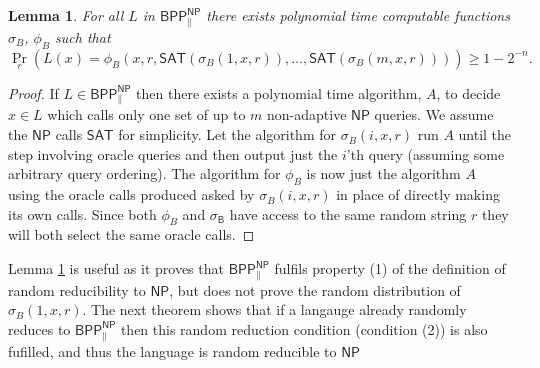 \documentclass[10pt,a4paper]{article}
\newtheorem{lemma}[theorem]{Lemma}
\begin{document}
\begin{lemma}\label{lma:BPP rr similarity}
    For all $L$ in $\mathsf{BPP^{NP}_{\parallel}}$ there exists polynomial time computable functions $\sigma_{B}$, $\phi_{B}$ such that
    \[
    \Pr_{r}\left(
            L(x)=\phi_{B}(x,r,\mathsf{SAT}(\sigma_{B}(1,x,r)),\ldots, \mathsf{SAT}(\sigma_{B}(m, x, r)))
            \right)\geq 1-2^{-n}.
    \]
\end{lemma}
\begin{proof}
    If $L\in \mathsf{BPP^{NP}_{\parallel}}$ then there exists a polynomial time algorithm, $A$, to decide $x \in L$ which calls only one set of up to $m$ non-adaptive $\mathsf{NP}$ queries. We assume the $\mathsf{NP}$ calls $\mathsf{SAT}$ for simplicity. Let the algorithm for $\sigma_{B}(i,x,r)$ run $A$ until the step involving oracle queries and then output just the $i$'th query (assuming some arbitrary query ordering).
    The algorithm for $\phi_{B}$ is now just the algorithm $A$ using the oracle calls produced asked by $\sigma_{B}(i,x,r)$ in place of directly making its own calls. Since both $\phi_{B}$ and $\mathsf{\sigma_{B}}$ have access to the same random string $r$ they will both select the same oracle calls.
\end{proof}
Lemma \ref{lma:BPP rr similarity} is useful as it proves that $\mathsf{BPP^{NP}_{\parallel}}$ fulfils property (1) of the definition of random reducibility to $\mathsf{NP}$, but does not prove the random distribution of ${\sigma_B(1,x,r)}$. The next theorem shows that if a langauge already randomly reduces to $\mathsf{BPP^{NP}_{\parallel}}$ then this random reduction condition (condition (2)) is also fufilled, and thus the language is random reducible to $\mathsf{NP}$
\end{document}
